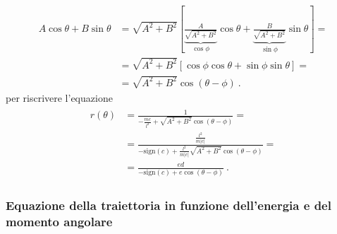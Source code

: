 \documentclass[letterpaper,10pt,italian]{jupyterBook}
\begin{document}
\begin{equation*}
\begin{split}A \cos \theta + B \sin \theta 
 & = \sqrt{A^2+B^2} \left[ \underbrace{\frac{A}{\sqrt{A^2+B^2}}}_{\cos \phi} \cos \theta + \underbrace{\frac{B}{\sqrt{A^2+B^2}}}_{\sin \phi} \sin \theta \right] = \\
 & = \sqrt{A^2+B^2} \left[ \cos \phi \cos \theta + \sin \phi \sin \theta \right] = \\
 & = \sqrt{A^2+B^2} \cos( \theta - \phi ) \ .
\end{split}
\end{equation*}
\sphinxAtStartPar
per riscrivere l’equazione
\begin{equation}\label{equation:ch/mechanics/dynamics-central:eq:dynamics:central:r-2:trajectory:conics}
\begin{split}\begin{aligned}
 r(\theta)
  & = \frac{1}{-\frac{m c}{l^2} + \sqrt{A^2 + B^2} \cos(\theta-\phi) } = \\
  & = \frac{ \frac{l^2}{m|c|} }{ - \text{sign}(c) + \frac{l^2}{m |c|} \sqrt{A^2 + B^2} \cos(\theta-\phi)} = \\
  & = \frac{ed}{-\text{sign}(c) + e \cos(\theta-\phi)} \ .
\end{aligned}\end{split}
\end{equation}\label{\detokenize{ch/mechanics/dynamics-central:physics-hs-mechanics-dynamics-motion-central-trajectory-el}}\subsubsection*{Equazione della traiettoria in funzione dell’energia e del momento angolare}
\end{document}
